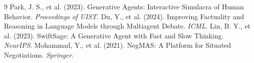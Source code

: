 \documentclass[11pt,a4paper]{ltjsarticle}
\begin{document}
\begin{thebibliography}{9}
Park, J. S., et al. (2023). Generative Agents: Interactive Simulacra of Human Behavior. \textit{Proceedings of UIST}.
Du, Y., et al. (2024). Improving Factuality and Reasoning in Language Models through Multiagent Debate. \textit{ICML}.
Lin, B. Y., et al. (2023). SwiftSage: A Generative Agent with Fast and Slow Thinking. \textit{NeurIPS}.
Mohammad, Y., et al. (2021). NegMAS: A Platform for Situated Negotiations. \textit{Springer}.
\end{thebibliography}
\end{document}
